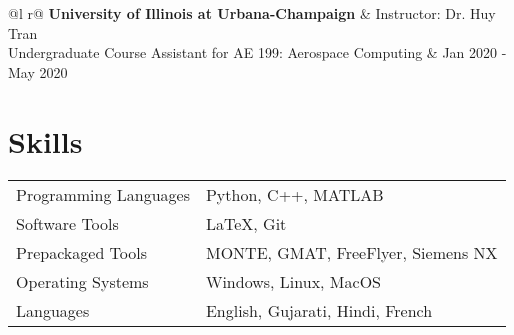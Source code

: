 \documentclass[letterpaper,12pt]{article}
\begin{document}
\begin{tabularx}{\linewidth}{ @{}l r@{} }
    \textbf{University of Illinois at Urbana-Champaign} & \hfill Instructor: Dr. Huy Tran \\[3.75pt]
    Undergraduate Course Assistant for AE 199: Aerospace Computing & \hfill Jan 2020 - May 2020 \\[3.75pt]
\end{tabularx}

\section{Skills}
\begin{tabularx}{\linewidth}{@{}l X@{}}
Programming Languages  &  Python, C++, MATLAB \\[3.75pt]
Software Tools  &  \LaTeX, Git \\[3.75pt]
Prepackaged Tools  &  MONTE, GMAT, FreeFlyer, Siemens NX \\[3.75pt]
Operating Systems  &  Windows, Linux, MacOS \\[3.75pt]
Languages  &  English, Gujarati, Hindi, French \\[3.75pt]
\end{tabularx}

\end{document}
